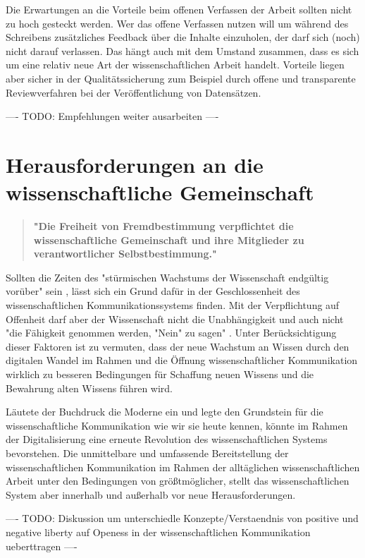 Die Erwartungen an die Vorteile beim offenen Verfassen der Arbeit sollten nicht zu hoch gesteckt werden. Wer das offene Verfassen nutzen will um während des Schreibens zusätzliches Feedback über die Inhalte einzuholen, der darf sich (noch) nicht darauf verlassen. Das hängt auch mit dem Umstand zusammen, dass es sich um eine relativ neue Art der wissenschaftlichen Arbeit handelt. Vorteile liegen aber sicher in der Qualitätssicherung zum Beispiel durch offene und transparente Reviewverfahren bei der Veröffentlichung von Datensätzen.

---- TODO: Empfehlungen weiter ausarbeiten ----

\section{Herausforderungen an die wissenschaftliche Gemeinschaft}

\begin{quote}
\textbf{"Die Freiheit von Fremdbestimmung verpflichtet die wissenschaftliche Gemeinschaft und ihre Mitglieder zu verantwortlicher Selbstbestimmung."}
\end{quote} \cite{Oezmen_2015}

Sollten die Zeiten des "stürmischen Wachstums der Wissenschaft endgültig vorüber" sein \cite{K_lbel_2002}, lässt sich ein Grund dafür in der Geschlossenheit des wissenschaftlichen Kommunikationssystems finden. Mit der Verpflichtung auf Offenheit darf aber der Wissenschaft nicht die Unabhängigkeit und auch nicht "die Fähigkeit genommen werden, "Nein" zu sagen" \cite{suchen_Hornbostel_2006}. Unter Berücksichtigung dieser Faktoren ist zu vermuten, dass der neue Wachstum an Wissen durch den digitalen Wandel im Rahmen und die Öffnung wissenschaftlicher Kommunikation wirklich zu besseren Bedingungen für Schaffung neuen Wissens und die Bewahrung alten Wissens führen wird.

Läutete der Buchdruck die Moderne ein und legte den Grundstein für die wissenschaftliche Kommunikation wie wir sie heute kennen, könnte im Rahmen der Digitalisierung eine erneute Revolution des wissenschaftlichen Systems bevorstehen. Die unmittelbare und umfassende Bereitstellung der wissenschaftlichen Kommunikation im Rahmen der alltäglichen wissenschaftlichen Arbeit unter den Bedingungen von größtmöglicher, stellt das wissenschaftlichen System aber innerhalb und außerhalb vor neue Herausforderungen.

---- TODO: Diskussion um unterschiedle Konzepte/Verstaendnis von positive und negative liberty \cite{kelty_2014_freedom} auf Openess in der wissenschaftlichen Kommunikation ueberttragen ----

